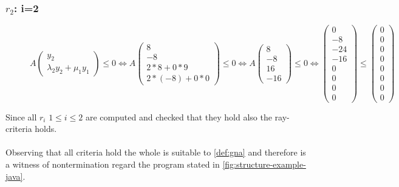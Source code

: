 	\subsubsection{$r_2$: i=2}
	\begin{figure}[H]
		\centering
		$A\begin{pmatrix} y_2 \\ \lambda_2y_2+\mu_1y_1 \end{pmatrix} \le 0 \Leftrightarrow A\begin{pmatrix} 8 \\ -8 \\ 2*8+0*9 \\ 2*(-8)+0*0 \end{pmatrix} \le 0 \Leftrightarrow A\begin{pmatrix} 8 \\ -8 \\ 16 \\ -16 \end{pmatrix} \le 0 \Leftrightarrow \begin{pmatrix} 0 \\ -8 \\ -24 \\ -16 \\ 0 \\ 0 \\ 0 \\ 0 \end{pmatrix} \le \begin{pmatrix} 0 \\ 0 \\ 0 \\ 0 \\ 0 \\ 0 \\ 0 \\ 0 \end{pmatrix}$
	\end{figure}

	Since all $r_i$ $1\le i \le 2$ are computed and checked that they hold also the ray-criteria holds.
	\\
	\\
	Observing that all criteria hold the whole \gna is suitable to \autoref{def:gna} and therefore is a witness of nontermination regard the program stated in \autoref{fig:structure-example-java}.
	
